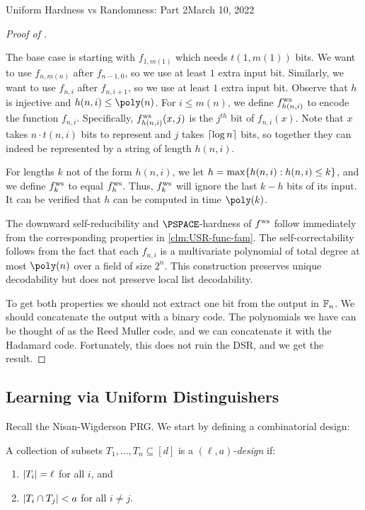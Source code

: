 \begin{lecture}{8}{Uniform Hardness vs Randomness: Part 2}{March 10, 2022}
\begin{proof}[Proof of  ]
\begin{itemize}
	\end{itemize}
	The base case is starting with $f_{1,m(1)}$ which needs $t(1, m(1))$ bits. We want to use $f_{n,m(n)}$ after $f_{n-1,0}$, so we use at least $1$ extra input bit. Similarly, we want to use $f_{n,i}$ after $f_{n,i+1}$, so we use at least $1$ extra input bit. 
	Observe that $h$ is injective and $h(n, i) \leq \poly(n)$. For $i \leq m(n)$, we define	$ f^{\text{ws}} _{h(n,i)}$ to encode the function $f_{n,i}$.  Specifically, $ f^{\text{ws}} _{h(n,i)}(x, j)$ is the $j^{th}$ bit of $f_{n,i}(x)$. Note that $x$ takes $n \cdot t(n, i)$ bits to represent and $j$ takes ${\left\lceil{\log n}\right\rceil}$ bits, so together they can indeed be represented by a string of length $h(n, i)$.

	For lengths $k$ not of the form $h(n, i)$, we let $h = \max \{h(n, i) : h(n, i) \leq k\}$, and we define $ f^{\text{ws}} _k$ to equal $ f^{\text{ws}} _h$. Thus, $ f^{\text{ws}} _k$ will ignore the last $k-h$ bits of its input. It can be verified that $h$ can be computed in time $\poly(k)$.

	The downward self-reducibility and $\PSPACE$-hardness of $ f^{\text{ws}} $ follow immediately from the corresponding properties in \ref{clm:USR-func-fam}. The self-correctability follows from the fact that each $f_{n,i}$ is a multivariate polynomial of total degree at most $\poly(n)$ over a field of size $2^n$. This construction preserves unique decodability but does not preserve local list decodability. 
	
	To get both properties we should not extract one bit from the output in $\mathbb{F}_n$. We should concatenate the output with a binary code. The polynomials we have can be thought of as the Reed Muller code, and we can concatenate it with the Hadamard code. Fortunately, this does not ruin the DSR, and we get the result.
\end{proof}

\subsection{Learning via Uniform Distinguishers}

Recall the Nisan-Wigderson PRG. We start by defining a combinatorial design:
\begin{definition}
	A collection of subsets $T_1, \dots, T_n \subseteq [d]$ is a \emph{$(\ell, a)$-design} if:
	\begin{enumerate}
		\item $\lvert T_i\rvert = \ell$ for all $i$, and
		\item $\lvert T_i \cap T_j\rvert < a$ for all $i \ne j$.
	\end{enumerate}
\end{definition}


\end{lecture}
